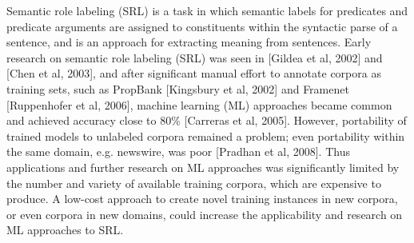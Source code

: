 Semantic role labeling (SRL) is a task in which semantic labels for predicates and predicate arguments are assigned to constituents within the syntactic parse of a sentence, and is an approach for extracting meaning from sentences.
Early research on semantic role labeling (SRL) was seen in [Gildea et al, 2002] and [Chen et al, 2003], and after significant manual effort to annotate corpora as training sets, such as PropBank [Kingsbury et al, 2002] and Framenet [Ruppenhofer et al, 2006], machine learning (ML) approaches became common and achieved accuracy close to 80\% [Carreras et al, 2005].
However, portability of trained models to unlabeled corpora remained a problem; even portability within the same domain, e.g. newswire, was poor [Pradhan et al, 2008].
Thus applications and further research on ML approaches was significantly limited by the number and variety of available training corpora, which are expensive to produce.
A low-cost approach to create novel training instances in new corpora, or even corpora in new domains, could increase the applicability and research on ML approaches to SRL.

